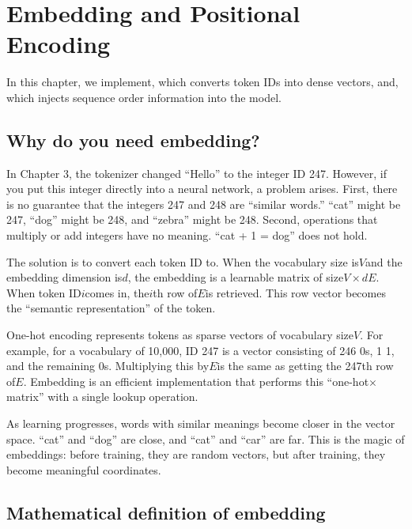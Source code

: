 \chapter{Embedding and Positional Encoding}
\label{ch:embedding}

In this chapter, we implement, which converts token IDs into dense vectors, and, which injects sequence order information into the model.

\section{Why do you need embedding?}

In Chapter 3, the tokenizer changed ``Hello'' to the integer ID 247. However, if you put this integer directly into a neural network, a problem arises. First, there is no guarantee that the integers 247 and 248 are ``similar words.'' ``cat'' might be 247, ``dog'' might be 248, and ``zebra'' might be 248. Second, operations that multiply or add integers have no meaning. ``cat + 1 = dog'' does not hold.

The solution is to convert each token ID to. When the vocabulary size is$V$and the embedding dimension is$d$, the embedding is a learnable matrix of size$V \times d$$E$. When token ID$i$comes in, the$i$th row of$E$is retrieved. This row vector becomes the ``semantic representation'' of the token.

\begin{infobox}
One-hot encoding represents tokens as sparse vectors of vocabulary size$V$. For example, for a vocabulary of 10,000, ID 247 is a vector consisting of 246 0s, 1 1, and the remaining 0s. Multiplying this by$E$is the same as getting the 247th row of$E$. Embedding is an efficient implementation that performs this ``one-hot$\times$matrix'' with a single lookup operation.

As learning progresses, words with similar meanings become closer in the vector space. ``cat'' and ``dog'' are close, and ``cat'' and ``car'' are far. This is the magic of embeddings: before training, they are random vectors, but after training, they become meaningful coordinates.
\end{infobox}

\section{Mathematical definition of embedding}

